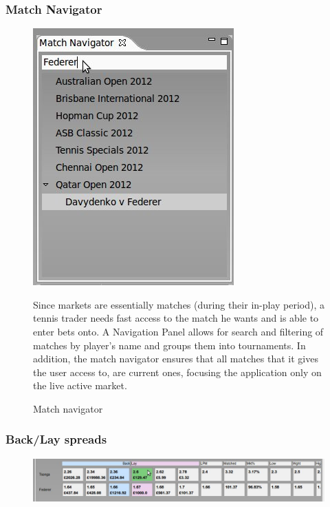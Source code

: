 \documentclass[10pt]{report}
\begin{document}
\subsubsection {Match Navigator}
\begin{figure}[ht]
\begin{minipage}[b]{5 cm}
\centering
\includegraphics[bb=0 0 650 350, scale = 0.35]{features-screenshots/navigator.jpg}
\caption{Match navigator}
\end{minipage}
\begin{minipage}[b]{7 cm}
Since markets are essentially matches (during their in-play period), a tennis trader needs fast access to the match he wants and is able to enter bets onto. A Navigation Panel allows for search and filtering of matches by player's name and groups them into tournaments. In addition, the match navigator ensures that all matches that it gives the user access to, are current ones, focusing the application only on the live active market.
\end{minipage}
\end{figure}

\subsubsection {Back/Lay spreads}
\begin{figure}[ht]
\centering
\includegraphics[bb=0 0 950 150, scale = 0.36]{features-screenshots/spread.jpg}
\end{figure}
\end{document}
